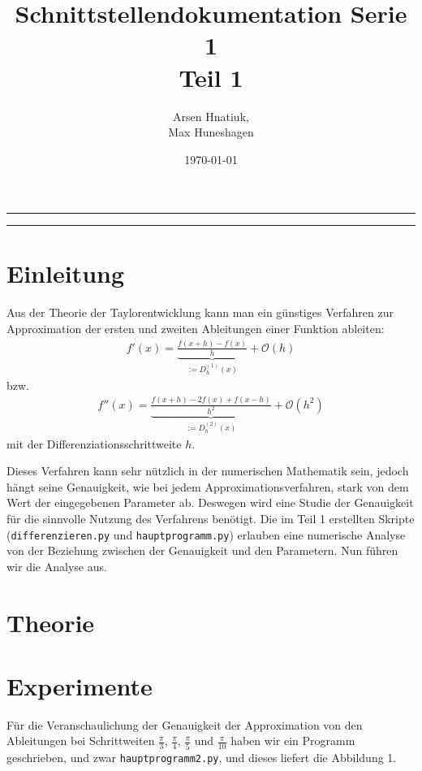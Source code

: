 \documentclass[smallheadings]{scrartcl}
\title{Schnittstellendokumentation Serie 1\\Teil 1}
\author{%
  Arsen Hnatiuk,\\%
  Max Huneshagen 
}
\date{\today}
\begin{document}
\maketitle
\tableofcontents
\bigskip

\hrule
\hrule


\section{Einleitung}
Aus der Theorie der Taylorentwicklung kann man ein günstiges Verfahren zur Approximation der ersten und zweiten Ableitungen einer Funktion ableiten: 
\begin{align}
\label{eq:1_abl}
f'(x)=\underbrace{\frac{f(x+h)-f(x)}{h}}_{:=D_h^{(1)}(x)}+\mathcal{O}(h)
\end{align}
bzw.
\begin{align}
\label{eq:2_abl}
f''(x)=\underbrace{\frac{f(x+h)-2f(x)+f(x-h)}{h^2}}_{:=D_h^{(2)}(x)}+\mathcal{O}(h^2)
\end{align}
mit der Differenziationsschrittweite $h$.

Dieses Verfahren kann sehr nützlich in der numerischen Mathematik sein, jedoch hängt seine Genauigkeit, wie bei jedem Approximationsverfahren, stark von dem Wert der eingegebenen Parameter ab. Deswegen wird eine Studie der Genauigkeit für die sinnvolle Nutzung des Verfahrens benötigt. Die im Teil 1 erstellten Skripte (\texttt{differenzieren.py} und \texttt{hauptprogramm.py}) erlauben eine numerische Analyse von der Beziehung zwischen der Genauigkeit und den Parametern. Nun führen wir die Analyse aus.

\section{Theorie}

\section{Experimente}
Für die Veranschaulichung der Genauigkeit der Approximation von den Ableitungen bei Schrittweiten $\frac{\pi}{3}$, $\frac{\pi}{4}$, $\frac{\pi}{5}$ und $\frac{\pi}{10}$ haben wir ein Programm geschrieben, und zwar \texttt{hauptprogramm2.py}, und dieses liefert die Abbildung 1.
\end{document}
